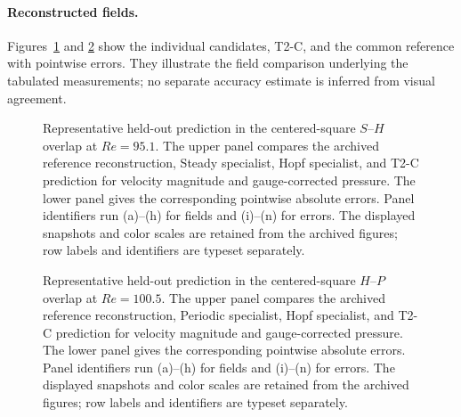\paragraph{Reconstructed fields.}
Figures~\ref{fig:app_square_sh_full} and \ref{fig:app_square_hp_full}
show the individual candidates, T2-C, and the common reference with
pointwise errors. They illustrate the field comparison underlying
the tabulated measurements; no separate accuracy estimate is inferred
from visual agreement.

\begin{figure}[p]
\centering
{}

\vspace{0.35em}
\caption{Representative held-out prediction in the centered-square
$S$--$H$ overlap at $Re=95.1$. The upper panel compares the archived reference reconstruction,
Steady specialist, Hopf specialist, and T2-C prediction for velocity
magnitude and gauge-corrected pressure. The lower panel gives the
corresponding pointwise absolute errors. Panel identifiers run (a)--(h) for fields and (i)--(n) for errors. The displayed snapshots and color scales are retained from the archived figures; row labels and identifiers are typeset separately.}
\label{fig:app_square_sh_full}
\end{figure}

\begin{figure}[p]
\centering
{}

\vspace{0.35em}
\caption{Representative held-out prediction in the centered-square
$H$--$P$ overlap at $Re=100.5$. The upper panel compares the archived reference reconstruction, Periodic specialist, Hopf specialist, and T2-C prediction for velocity magnitude and gauge-corrected pressure. The lower panel gives the
corresponding pointwise absolute errors. Panel identifiers run (a)--(h) for fields and (i)--(n) for errors. The displayed snapshots and color scales are retained from the archived figures; row labels and identifiers are typeset separately.}
\label{fig:app_square_hp_full}
\end{figure}

\FloatBarrier
